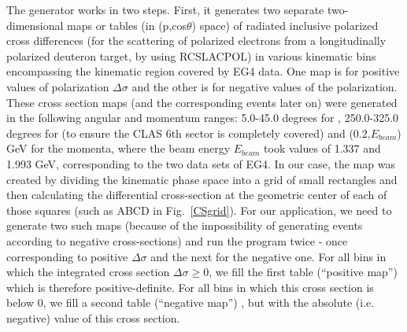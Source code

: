 The generator works in two steps. First, it generates two separate two-dimensional maps or tables (in (p,cos$\theta$) space) of radiated inclusive polarized cross differences %
(for the scattering of polarized electrons from a longitudinally polarized deuteron target, by using RCSLACPOL) in various kinematic bins encompassing the kinematic region covered by EG4 data. One map is for positive values of polarization $\Delta \sigma$ and the other is for negative values of the polarization.
These cross section maps (and the corresponding events later on) were generated in the following angular and momentum ranges: 5.0-45.0 degrees for \th, 250.0-325.0 degrees for \ph (to ensure the CLAS 6th sector is completely covered) and (0.2,$E_{beam}$) GeV for the momenta, where the beam energy $E_{beam}$ took values of 1.337 and 1.993 GeV, corresponding to the two  data sets of EG4. 
In our case, the map was created by dividing the kinematic phase space into a grid of small rectangles %
and then calculating the differential cross-section at the geometric center of each of those squares (such as ABCD in Fig.~\ref{CSgrid}).
 For our application, we need to generate two such maps (because of the impossibility %
of generating events according to negative cross-sections) and run the program twice - once corresponding to positive %
$\Delta \sigma$ and the next for the negative one. For all bins in which the integrated cross section $\Delta \sigma \ge 0$, we fill the first table (``positive map'') which is therefore positive-definite. For all bins in which this cross section is below $0$, we fill a second table (``negative map'') , but with the absolute (i.e. negative) value of this cross section. %

